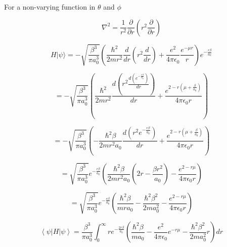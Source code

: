 \documentclass[12pt]{article}
\begin{document}
For a non-varying function in $\theta$ and $\phi$

\[
    \nabla^2 = \frac{1}{r^2}\frac{\partial}{\partial r}(r^2 \frac{\partial}{\partial r})
\]

\[
    H | \psi \rangle = - \sqrt{\frac{\beta^3}{\pi a_0^3}} \left(\frac{\hbar^2}{2m r^2}\frac{d}{d r}(r^2 \frac{d}{d r}) + \frac{e^2}{4\pi \epsilon_0} \frac{e^{-\mu r}}{r}\right) e^{-\frac{r \beta}{a_0}}
\]

\[
    = - \sqrt{\frac{\beta^3}{\pi a_0^3}} \left(\frac{\hbar^2}{2m r^2}\frac{d (r^2 \frac{d (e^{-\frac{r \beta}{a_0}})}{d r})}{d r} + \frac{e^{2 - r(\mu + \frac{\beta}{a_0})}}{4 \pi \epsilon_0 r}\right)
\]

\[
    = - \sqrt{\frac{\beta^3}{\pi a_0^3}} \left(- \frac{\hbar^2 \beta}{2m r^2 a_0}\frac{d (r^2 e^{-\frac{r \beta}{a_0}})}{d r} + \frac{e^{2 - r(\mu + \frac{\beta}{a_0})}}{4 \pi \epsilon_0 r}\right)
\]

\[
    = \sqrt{\frac{\beta^3}{\pi a_0^3}} e^{-\frac{r \beta}{a_0}} \left(\frac{\hbar^2 \beta}{2m r^2 a_0}(2 r - \frac{\beta r^2}{a_0}) - \frac{e^{2 - r\mu}}{4 \pi \epsilon_0 r}\right)
\]

\[
    = \sqrt{\frac{\beta^3}{\pi a_0^3}} e^{-\frac{r \beta}{a_0}} \left(\frac{\hbar^2 \beta}{m r a_0} - \frac{\hbar^2 \beta^2}{2m a_0^2} - \frac{e^{2 - r\mu}}{4 \pi \epsilon_0 r}\right)
\]



\[
    \left\langle \psi \left| H \right| \psi\right\rangle  = \frac{\beta^3}{\pi a_0^3} \int_0^\infty r e^{-\frac{2 r \beta}{a_0}} \left(\frac{\hbar^2 \beta}{m a_0} - \frac{e^2}{4 \pi \epsilon_0} e^{-r\mu} - \frac{\hbar^2 \beta^2}{2m a_0^2} r\right) dr
\]
\end{document}
